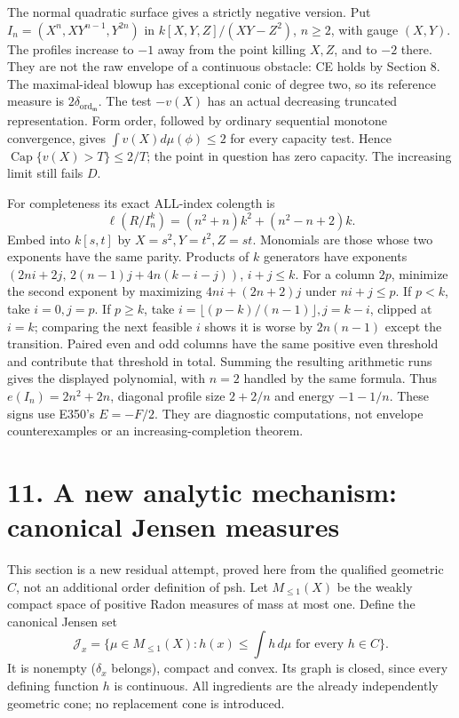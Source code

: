\documentclass[11pt]{article}
\begin{document}
The normal quadratic surface gives a strictly negative version. Put \(I_n=(X^n,XY^{n-1},Y^{2n})\) in \(k[X,Y,Z]/(XY-Z^2)\), \(n\ge2\), with gauge \((X,Y)\). The profiles increase to \(-1\) away from the point killing \(X,Z\), and to \(-2\) there. They are not the raw envelope of a continuous obstacle: CE holds by Section 8. The maximal-ideal blowup has exceptional conic of degree two, so its reference measure is \(2\delta_{\operatorname{ord}_{\mathfrak m}}\). The test \(-v(X)\) has an actual decreasing truncated representation. Form order, followed by ordinary sequential monotone convergence, gives \(\int v(X)d\mu(\phi)\le2\) for every capacity test. Hence \(\operatorname{Cap}\{v(X)>T\}\le2/T\); the point in question has zero capacity. The increasing limit still fails \(D\).

For completeness its exact ALL-index colength is
\[
\ell(R/I_n^k)=(n^2+n)k^2+(n^2-n+2)k.
\]
Embed into \(k[s,t]\) by \(X=s^2,Y=t^2,Z=st\). Monomials are those whose two exponents have the same parity. Products of \(k\) generators have exponents \((2ni+2j,\,2(n-1)j+4n(k-i-j))\), \(i+j\le k\). For a column \(2p\), minimize the second exponent by maximizing \(4ni+(2n+2)j\) under \(ni+j\le p\). If \(p<k\), take \(i=0,j=p\). If \(p\ge k\), take \(i=\lfloor(p-k)/(n-1)\rfloor,j=k-i\), clipped at \(i=k\); comparing the next feasible \(i\) shows it is worse by \(2n(n-1)\) except the transition. Paired even and odd columns have the same positive even threshold and contribute that threshold in total. Summing the resulting arithmetic runs gives the displayed polynomial, with \(n=2\) handled by the same formula. Thus \(e(I_n)=2n^2+2n\), diagonal profile size \(2+2/n\) and energy \(-1-1/n\). These signs use E350's \(E=-F/2\). They are diagnostic computations, not envelope counterexamples or an increasing-completion theorem.

\section{11. A new analytic mechanism: canonical Jensen measures}

This section is a new residual attempt, proved here from the qualified geometric \(C\), not an additional order definition of psh. Let \(M_{\le1}(X)\) be the weakly compact space of positive Radon measures of mass at most one. Define the canonical Jensen set
\[
\mathcal J_x=\{\mu\in M_{\le1}(X):h(x)\le\int h\,d\mu\text{ for every }h\in C\}.
\]
It is nonempty (\(\delta_x\) belongs), compact and convex. Its graph is closed, since every defining function \(h\) is continuous. All ingredients are the already independently geometric cone; no replacement cone is introduced.
\end{document}
